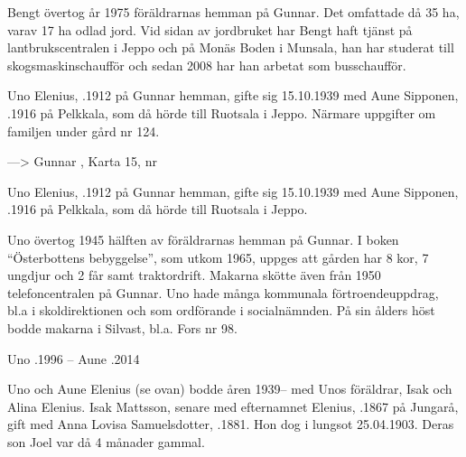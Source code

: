 Bengt övertog år 1975 föräldrarnas hemman på Gunnar. Det omfattade då 35 ha, varav 17 ha odlad jord. Vid sidan av jordbruket har Bengt haft tjänst på lantbrukscentralen i Jeppo och på Monäs Boden i Munsala, han har studerat till skogsmaskinschaufför och sedan 2008 har han arbetat som busschaufför.


Uno Elenius, .1912 på Gunnar hemman, gifte sig 15.10.1939 med Aune Sipponen, .1916 på Pelkkala, som då hörde till Ruotsala i Jeppo. Närmare uppgifter om familjen under gård nr 124.


---> Gunnar , Karta 15, nr 


Uno Elenius, .1912 på Gunnar hemman, gifte sig 15.10.1939 med Aune Sipponen, .1916 på Pelkkala, som då hörde till Ruotsala i Jeppo.

\begin{jhchildren}
  \item {}
  \item {}
  \item {}
  \item {}
\end{jhchildren}

Uno övertog 1945 hälften av föräldrarnas hemman på Gunnar. I boken ``Österbottens bebyggelse'', som utkom 1965, uppges att gården har 8 kor, 7 ungdjur och 2 får samt traktordrift. Makarna skötte även från 1950 telefoncentralen på Gunnar. Uno hade många kommunala förtroendeuppdrag, bl.a i skoldirektionen och som ordförande i socialnämnden. På sin ålders höst bodde makarna i Silvast, bl.a. Fors nr 98.

Uno .1996  --  Aune .2014



Uno och Aune Elenius (se ovan) bodde åren 1939-- med Unos föräldrar, Isak och Alina Elenius. Isak Mattsson, senare med efternamnet Elenius, .1867 på Jungarå, gift med Anna Lovisa Samuelsdotter, .1881. Hon dog i lungsot 25.04.1903. Deras son Joel var då 4 månader gammal.

